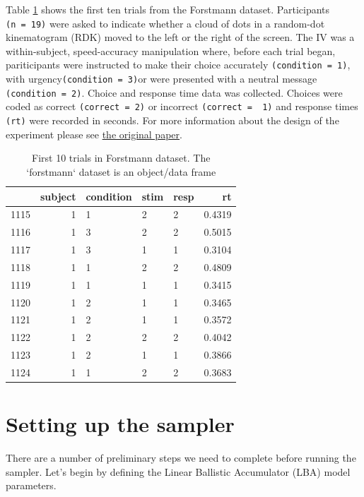 \documentclass[]{book}
\begin{document}
Table \ref{tab:forsthead10} shows the first ten trials from the Forstmann dataset. Participants \texttt{(n\ =\ 19)} were asked to indicate whether a cloud of dots in a random-dot kinematogram (RDK) moved to the left or the right of the screen. The IV was a within-subject, speed-accuracy manipulation where, before each trial began, pariticipants were instructed to make their choice accurately \texttt{(condition\ =\ 1)}, with urgency\texttt{(condition\ =\ 3)}or were presented with a neutral message \texttt{(condition\ =\ 2)}. Choice and response time data was collected. Choices were coded as correct \texttt{(correct\ =\ 2)} or incorrect \texttt{(correct\ =\ \ 1)} and response times \texttt{(rt)} were recorded in seconds. For more information about the design of the experiment please see \href{https://www.pnas.org/content/105/45/17538.short}{the original paper}.

\begin{table}

\caption{\label{tab:forsthead10}First 10 trials in Forstmann dataset. The `forstmann` dataset is an object/data frame }
\centering
\begin{tabular}[t]{l|r|l|l|l|r}
\hline
  & subject & condition & stim & resp & rt\\
\hline
1115 & 1 & 1 & 2 & 2 & 0.4319\\
\hline
1116 & 1 & 3 & 2 & 2 & 0.5015\\
\hline
1117 & 1 & 3 & 1 & 1 & 0.3104\\
\hline
1118 & 1 & 1 & 2 & 2 & 0.4809\\
\hline
1119 & 1 & 1 & 1 & 1 & 0.3415\\
\hline
1120 & 1 & 2 & 1 & 1 & 0.3465\\
\hline
1121 & 1 & 2 & 1 & 1 & 0.3572\\
\hline
1122 & 1 & 2 & 2 & 2 & 0.4042\\
\hline
1123 & 1 & 2 & 1 & 1 & 0.3866\\
\hline
1124 & 1 & 1 & 2 & 2 & 0.3683\\
\hline
\end{tabular}
\end{table}

\hypertarget{setting-up-the-sampler}{%
\section{Setting up the sampler}\label{setting-up-the-sampler}}

There are a number of preliminary steps we need to complete before running the sampler. Let's begin by defining the Linear Ballistic Accumulator (LBA) \citep{brown2008simplest} model parameters.
\end{document}
